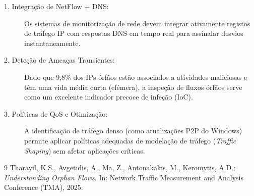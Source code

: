 \documentclass[11pt, a4paper]{article}
\begin{document}
\begin{description}
    \item[1. Integração de NetFlow + DNS:] Os sistemas de monitorização de rede devem integrar ativamente registos de tráfego IP com respostas DNS em tempo real para assinalar desvios instantaneamente. 
    \item[2. Deteção de Ameaças Transientes:] Dado que 9,8\% dos IPs órfãos estão associados a atividades maliciosas e têm uma vida média curta (efémera), a inspeção de fluxos órfãos serve como um excelente indicador precoce de infeção (IoC). 
    \item[3. Políticas de QoS e Otimização:] A identificação de tráfego denso (como atualizações P2P do Windows) permite aplicar políticas adequadas de modelação de tráfego (\textit{Traffic Shaping}) sem afetar aplicações críticas.
\end{description}

\begin{thebibliography}{9}
Tharayil, K.S., Avgetidis, A., Ma, Z., Antonakakis, M., Keromytis, A.D.:
\textit{Understanding Orphan Flows}. In: Network Traffic Measurement and Analysis Conference (TMA), 2025.
\end{thebibliography}
\end{document}
